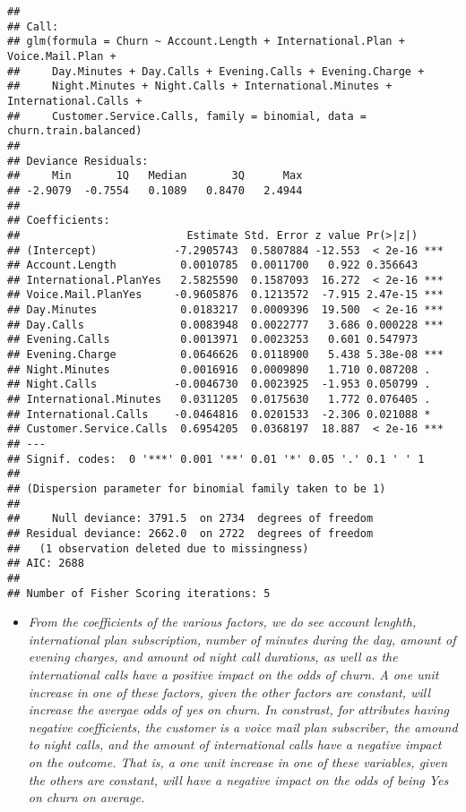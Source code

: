 \documentclass[]{article}
\providecommand{\tightlist}{%
  \setlength{\itemsep}{0pt}\setlength{\parskip}{0pt}}
\begin{document}
\begin{verbatim}
## 
## Call:
## glm(formula = Churn ~ Account.Length + International.Plan + Voice.Mail.Plan + 
##     Day.Minutes + Day.Calls + Evening.Calls + Evening.Charge + 
##     Night.Minutes + Night.Calls + International.Minutes + International.Calls + 
##     Customer.Service.Calls, family = binomial, data = churn.train.balanced)
## 
## Deviance Residuals: 
##     Min       1Q   Median       3Q      Max  
## -2.9079  -0.7554   0.1089   0.8470   2.4944  
## 
## Coefficients:
##                          Estimate Std. Error z value Pr(>|z|)    
## (Intercept)            -7.2905743  0.5807884 -12.553  < 2e-16 ***
## Account.Length          0.0010785  0.0011700   0.922 0.356643    
## International.PlanYes   2.5825590  0.1587093  16.272  < 2e-16 ***
## Voice.Mail.PlanYes     -0.9605876  0.1213572  -7.915 2.47e-15 ***
## Day.Minutes             0.0183217  0.0009396  19.500  < 2e-16 ***
## Day.Calls               0.0083948  0.0022777   3.686 0.000228 ***
## Evening.Calls           0.0013971  0.0023253   0.601 0.547973    
## Evening.Charge          0.0646626  0.0118900   5.438 5.38e-08 ***
## Night.Minutes           0.0016916  0.0009890   1.710 0.087208 .  
## Night.Calls            -0.0046730  0.0023925  -1.953 0.050799 .  
## International.Minutes   0.0311205  0.0175630   1.772 0.076405 .  
## International.Calls    -0.0464816  0.0201533  -2.306 0.021088 *  
## Customer.Service.Calls  0.6954205  0.0368197  18.887  < 2e-16 ***
## ---
## Signif. codes:  0 '***' 0.001 '**' 0.01 '*' 0.05 '.' 0.1 ' ' 1
## 
## (Dispersion parameter for binomial family taken to be 1)
## 
##     Null deviance: 3791.5  on 2734  degrees of freedom
## Residual deviance: 2662.0  on 2722  degrees of freedom
##   (1 observation deleted due to missingness)
## AIC: 2688
## 
## Number of Fisher Scoring iterations: 5
\end{verbatim}

\begin{itemize}
\tightlist
\item
  \emph{From the coefficients of the various factors, we do see account
  lenghth, international plan subscription, number of minutes during the
  day, amount of evening charges, and amount od night call durations, as
  well as the international calls have a positive impact on the odds of
  churn. A one unit increase in one of these factors, given the other
  factors are constant, will increase the avergae odds of yes on churn.
  In constrast, for attributes having negative coefficients, the
  customer is a voice mail plan subscriber, the amound to night calls,
  and the amount of international calls have a negative impact on the
  outcome. That is, a one unit increase in one of these variables, given
  the others are constant, will have a negative impact on the odds of
  being Yes on churn on average.}
\end{itemize}
\end{document}
